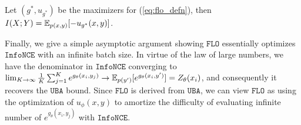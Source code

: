 \documentclass{article}
\theoremstyle{plain}
\theoremstyle{definition}
\theoremstyle{remark}
\newcommand{\infonce}{\texttt{InfoNCE}}
\newcommand{\UBA}{\texttt{UBA}}
\newcommand{\TUBA}{\texttt{TUBA}}
\newcommand{\FLO}{\texttt{FLO}}
\begin{document}
		\begin{col}
			\label{thm:fince_mi}
			Let $(g^*, u_{g^*})$ be the maximizers for (\ref{eq:flo_defn}), then $I(X;Y) = \mathbb{E}_{p(x,y)}[-u_{g^*}(x,y)]$.
		\end{col}
		
		
		
		
		Finally, we give a simple asymptotic argument showing $\FLO$ essentially optimizes $\infonce$ with an infinite batch size. In virtue of the law of large numbers, we have the denominator in $\infonce$ converging to $\lim_{K\rightarrow \infty} \frac{1}{K} \sum_{j=1}^K e^{g_{\theta}(x_i, y_j)} \rightarrow \mathbb{E}_{p(y')}[e^{g_{\theta}(x_i, y')}] = Z_{\theta}(x_i)$, and consequently it recovers the $\UBA$ bound. Since $\FLO$ is derived from $\UBA$, we can view $\FLO$ as using the optimization of $u_{\phi}(x, y)$ to amortize the difficulty of evaluating infinite number of $e^{g_{\theta}(x_i, y_j)}$ with $\infonce$.
		
		
		
\end{document}
